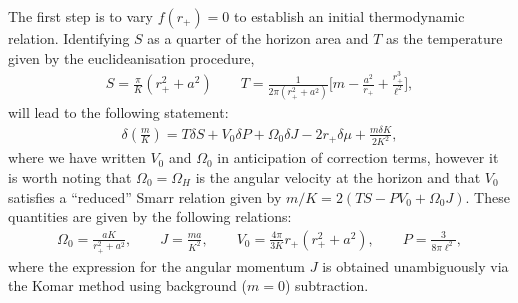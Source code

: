 \documentclass[
twoside,
openright,
frontopenright
]{dmathesis}
\begin{document}
The first step is to vary $f(r_+)=0$ to establish an initial thermodynamic
relation. Identifying $S$ as a quarter of the horizon area and $T$ as the
temperature given by the euclideanisation procedure,
\begin{align} \label{eq:SandT-al}
S = \frac{\pi}{K}(r_+^2+a^2) \qquad
  T=\frac{1}{2\pi(r_{+}^{2}+a^{2})}
  \bigg[m-\frac{a^{2}}{r_{+}}+\frac{r_{+}^{3}}{\ell^{2}}\bigg], 
\end{align}
will lead to the following statement:
\begin{align}\label{eq:master-al}
\delta\left(\frac{m}{K}\right)=T\delta S +V_0\delta P + \Omega_0\delta J -
  2r_+\delta\mu + \frac{m\delta K}{2K^2},
\end{align}
where we have written $V_0$ and $\Omega_0$ in anticipation of correction terms,
however it is worth noting that $\Omega_0=\Omega_H$ is the angular velocity at
the horizon and that $V_0$ satisfies a ``reduced'' Smarr relation given by
$m/K = 2(TS-PV_0+\Omega_0 J)$. These quantities are given by the following relations:
\begin{align} \label{eq:horpotentials-al}
\Omega_0 =  \frac{a K}{r_{+}^{2}+a^{2}}, \qquad J=\frac{ma}{K^2}, \qquad V_0 =
  \frac{4\pi}{3K}r_+(r_+^2+a^2), \qquad P = \frac{3}{8\pi\ell^2}, 
\end{align}
where the expression for the angular momentum $J$ is obtained unambiguously via the
Komar method using background ($m=0$) subtraction.
\end{document}
